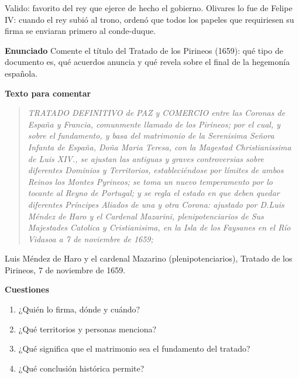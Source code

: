 \documentclass{book}
\begin{document}
\begin{tcolorbox}[title={Definición}, studiumdef, breakable]

Valido: favorito del rey que ejerce de hecho el gobierno. Olivares lo fue de Felipe IV: cuando el rey subió al trono, ordenó que todos los papeles que requiriesen su firma se enviaran primero al conde-duque.

\end{tcolorbox}

\begin{tcolorbox}[title={Ejercicio resuelto}, studiumworked, breakable]

\noindent\textbf{Enunciado}
Comente el título del Tratado de los Pirineos (1659): qué tipo de documento es, qué acuerdos anuncia y qué revela sobre el final de la hegemonía española.


\noindent\textbf{Texto para comentar}

\begin{quote}
\itshape TRATADO DEFINITIVO de PAZ y COMERCIO entre las Coronas de España y Francia, comunmente llamado de los Pirineos; por el cual, y sobre el fundamento, y basa del matrimonio de la Serenisima Señora Infanta de España, Doña Maria Teresa, con la Magestad Christianissima de Luis XIV., se ajustan las antiguas y graves controversias sobre diferentes Dominios y Territorios, estableciéndose por límites de ambos Reinos los Montes Pyrineos; se toma un nuevo temperamento por lo tocante al Reyno de Portugal; y se regla el estado en que deben quedar diferentes Príncipes Aliados de una y otra Corona: ajustado por D.Luis Méndez de Haro y el Cardenal Mazarini, plenipotenciarios de Sus Majestades Catolica y Cristianisima, en la Isla de los Faysanes en el Río Vidasoa a 7 de noviembre de 1659;
\end{quote}
{\noindent\footnotesize Luis Méndez de Haro y el cardenal Mazarino (plenipotenciarios), Tratado de los Pirineos, 7 de noviembre de 1659.\par}

\noindent\textbf{Cuestiones}
\begin{enumerate}
\item ¿Quién lo firma, dónde y cuándo?
\item ¿Qué territorios y personas menciona?
\item ¿Qué significa que el matrimonio sea el fundamento del tratado?
\item ¿Qué conclusión histórica permite?
\end{enumerate}


\end{tcolorbox}
\end{document}
